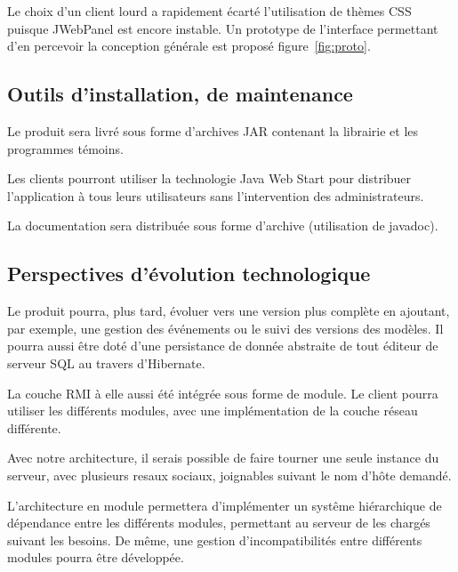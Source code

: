 Le choix d'un client lourd a rapidement écarté l'utilisation de thèmes CSS puisque JWebPanel est encore instable. Un prototype de l'interface permettant d'en percevoir la conception générale est proposé figure~\ref{fig:proto}.

\subsection{Outils d’installation, de maintenance}

Le produit sera livré sous forme d'archives JAR contenant la librairie et les programmes témoins.

Les clients pourront utiliser la technologie Java Web Start pour distribuer l'application à tous leurs utilisateurs sans l'intervention des administrateurs.

La documentation sera distribuée sous forme d'archive (utilisation de javadoc).

\subsection{Perspectives d’évolution technologique}

Le produit pourra, plus tard, évoluer vers une version plus complète en ajoutant, par exemple, une gestion des événements ou le suivi des versions des modèles.
Il pourra aussi être doté d'une persistance de donnée abstraite de tout éditeur de serveur SQL au travers d'Hibernate.

La couche RMI à elle aussi été intégrée sous forme de module. Le client pourra utiliser les différents modules, avec une implémentation de la couche réseau différente.

Avec notre architecture, il serais possible de faire tourner une seule instance du serveur, avec plusieurs resaux sociaux, joignables suivant le nom d'hôte demandé.

L'architecture en module permettera d'implémenter un systême hiérarchique de dépendance entre les différents modules, permettant au serveur de les chargés suivant les besoins.
De même, une gestion d'incompatibilités entre différents modules pourra être développée.